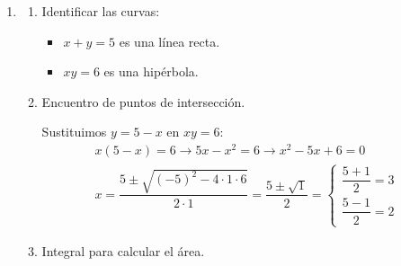 \begin{enumerate}[label=\color{red}\textbf{\arabic*)}, leftmargin=*]
\begin{enumerate}[label=\color{red}\textbf{\alph*)}]
\begin{enumerate}[label=\arabic*)]
      $\begin{array}{l}
        \lb{I_1}=\int_{-2}^{4}\dfrac{x}{2}\dx =\dfrac{1}{2}\int_{-2}^{4}x\dx=\dfrac{1}{2}\cdot \left[ \dfrac{x^2}{2} \right]_{-2}^{4}=\dfrac{1}{2}\cdot 6=3\\
        \db{I_2}=\int_{-2}^{4}2\dx =2\cdot [x]_{-2}^{4}=12\\
        \rc{I_3}=\int_{-2}^{4}\dfrac{x^2}{4}\dx =\dfrac{1}{4}\int_{-2}^{4}x^2\dx =\dfrac{1}{4}\left[ \dfrac{x^3}{3} \right] _{-2}^{4}=\dfrac{1}{4}\cdot 24=6    
      \end{array}$

  \end{enumerate}
\item {}

  \begin{enumerate}[label=\arabic*)]
    \item Identificar las curvas:
      \begin{itemize}[label=\textbullet]
        \item $x+y=5$ es una línea recta.
        \item  $xy=6$ es una hipérbola.
      \end{itemize}

  \item Encuentro de puntos de intersección.

    Sustituimos $y=5-x$ en  $xy=6$:  \[
    \begin{array}{l}
      x(5-x)=6\longrightarrow 5x-x^2=6\longrightarrow x^2-5x+6=0\\
      x=\dfrac{5\pm\sqrt{(-5)^2-4\cdot 1\cdot 6}}{2\cdot 1}=\dfrac{5\pm\sqrt{1} }{2}=\begin{cases}
        \dfrac{5+1}{2}=3\\
        \dfrac{5-1}{2}=2
      \end{cases}
    \end{array}
    \] 
  \item Integral para calcular el área.


\end{enumerate}
\end{enumerate}
\end{enumerate}
